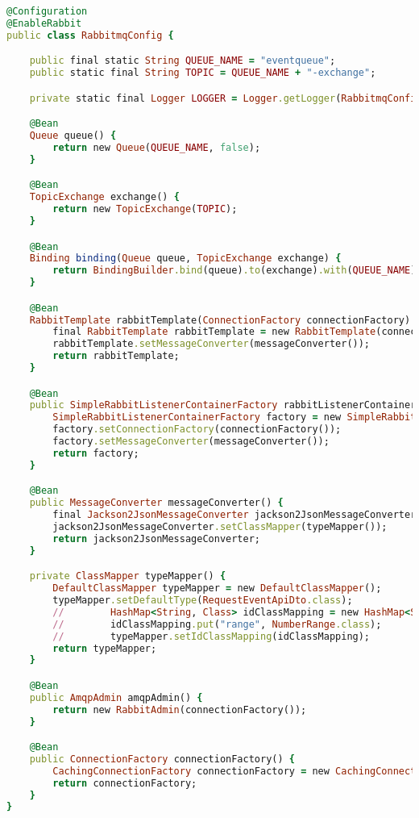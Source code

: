 \begin{lstlisting}[language=Ruby, style=rubystyle]
@Configuration
@EnableRabbit
public class RabbitmqConfig {

    public final static String QUEUE_NAME = "eventqueue";
    public static final String TOPIC = QUEUE_NAME + "-exchange";

    private static final Logger LOGGER = Logger.getLogger(RabbitmqConfig.class);

    @Bean
    Queue queue() {
        return new Queue(QUEUE_NAME, false);
    }

    @Bean
    TopicExchange exchange() {
        return new TopicExchange(TOPIC);
    }

    @Bean
    Binding binding(Queue queue, TopicExchange exchange) {
        return BindingBuilder.bind(queue).to(exchange).with(QUEUE_NAME);
    }

    @Bean
    RabbitTemplate rabbitTemplate(ConnectionFactory connectionFactory) {
        final RabbitTemplate rabbitTemplate = new RabbitTemplate(connectionFactory);
        rabbitTemplate.setMessageConverter(messageConverter());
        return rabbitTemplate;
    }

    @Bean
    public SimpleRabbitListenerContainerFactory rabbitListenerContainerFactory() {
        SimpleRabbitListenerContainerFactory factory = new SimpleRabbitListenerContainerFactory();
        factory.setConnectionFactory(connectionFactory());
        factory.setMessageConverter(messageConverter());
        return factory;
    }

    @Bean
    public MessageConverter messageConverter() {
        final Jackson2JsonMessageConverter jackson2JsonMessageConverter = new Jackson2JsonMessageConverter();
        jackson2JsonMessageConverter.setClassMapper(typeMapper());
        return jackson2JsonMessageConverter;
    }

    private ClassMapper typeMapper() {
        DefaultClassMapper typeMapper = new DefaultClassMapper();
        typeMapper.setDefaultType(RequestEventApiDto.class);
        //        HashMap<String, Class> idClassMapping = new HashMap<String, Class>();
        //        idClassMapping.put("range", NumberRange.class);
        //        typeMapper.setIdClassMapping(idClassMapping);
        return typeMapper;
    }

    @Bean
    public AmqpAdmin amqpAdmin() {
        return new RabbitAdmin(connectionFactory());
    }

    @Bean
    public ConnectionFactory connectionFactory() {
        CachingConnectionFactory connectionFactory = new CachingConnectionFactory("127.0.0.1");
        return connectionFactory;
    }
}


\end{lstlisting}
